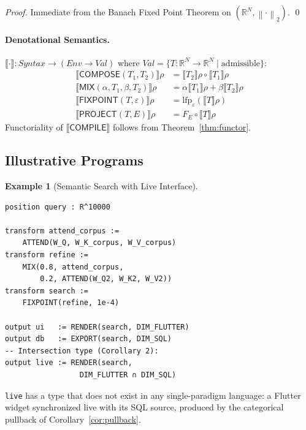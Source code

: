 \documentclass[10pt,twocolumn]{article}
\theoremstyle{plain}
\theoremstyle{definition}
\newtheorem{example}[theorem]{Example}
\theoremstyle{remark}
\newcommand{\RR}{\mathbb{R}}
\newcommand{\Compose}{\mathsf{COMPOSE}}
\newcommand{\Mix}{\mathsf{MIX}}
\newcommand{\Fixpoint}{\mathsf{FIXPOINT}}
\newcommand{\Project}{\mathsf{PROJECT}}
\newcommand{\norm}[1]{\left\|#1\right\|}
\newcommand{\lfp}{\mathrm{lfp}}
\begin{document}
\begin{proof}
Immediate from the Banach Fixed Point Theorem on $(\RR^N, \norm{\cdot}_2)$. \qed
\end{proof}

\paragraph{Denotational Semantics.}
$\llbracket\cdot\rrbracket \colon \mathit{Syntax} \to (\mathit{Env} \to
\mathit{Val})$ where $\mathit{Val} = \{T\colon \RR^N \to \RR^N \mid
\text{admissible}\}$:
\begin{align*}
\llbracket\Compose(T_1, T_2)\rrbracket\rho &= \llbracket T_2\rrbracket\rho \circ \llbracket T_1\rrbracket\rho \\
\llbracket\Mix(\alpha,T_1,\beta,T_2)\rrbracket\rho &= \alpha\llbracket T_1\rrbracket\rho + \beta\llbracket T_2\rrbracket\rho \\
\llbracket\Fixpoint(T,\varepsilon)\rrbracket\rho &= \lfp_\varepsilon(\llbracket T\rrbracket\rho) \\
\llbracket\Project(T,E)\rrbracket\rho &= F_E \circ \llbracket T\rrbracket\rho
\end{align*}
Functoriality of $\llbracket\mathsf{COMPILE}\rrbracket$ follows from
Theorem~\ref{thm:functor}.

\subsection{Illustrative Programs}

\begin{example}[Semantic Search with Live Interface]
\begin{lstlisting}[language=polydim,caption={Semantic search converging to a stable result projected simultaneously to Flutter and SQL.}]
position query : R^10000

transform attend_corpus :=
    ATTEND(W_Q, W_K_corpus, W_V_corpus)
transform refine :=
    MIX(0.8, attend_corpus,
        0.2, ATTEND(W_Q2, W_K2, W_V2))
transform search :=
    FIXPOINT(refine, 1e-4)

output ui   := RENDER(search, DIM_FLUTTER)
output db   := EXPORT(search, DIM_SQL)
-- Intersection type (Corollary 2):
output live := RENDER(search,
                 DIM_FLUTTER ∩ DIM_SQL)
\end{lstlisting}
\texttt{live} has a type that does not exist in any single-paradigm language: a
Flutter widget synchronized live with its SQL source, produced by the categorical
pullback of Corollary~\ref{cor:pullback}.
\end{example}
\end{document}
